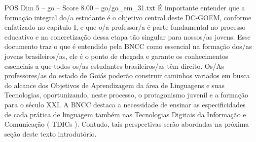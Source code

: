 \begin{textsample}{POS Dim 5 – go – Score 8.00 – go/go\_em\_31.txt}
É importante entender que a formação integral do/a estudante é o objetivo central deste DC-GOEM, conforme enfatizado no capítulo I, e que o/a professor/a é parte fundamental no processo educativo e na concretização dessa etapa tão singular para nossos/as jovens.
Esse documento traz o que é entendido pela BNCC como essencial na formação dos/as jovens brasileiros/as, ele é o ponto de chegada e garante os conhecimentos essenciais a que todos os/as estudantes brasileiros/as têm direito.
Os/As professores/as do estado de Goiás poderão construir caminhos variados em busca do alcance dos Objetivos de Aprendizagem da área de Linguagens e suas Tecnologias, oportunizando, neste processo, o protagonismo juvenil e a formação para o século XXI.
A BNCC destaca a necessidade de ensinar as especificidades de cada prática de linguagem também nas Tecnologias Digitais da Informação e Comunicação ( TDICs ).
Contudo, tais perspectivas serão abordadas na próxima seção deste texto introdutório.

\end{textsample}
